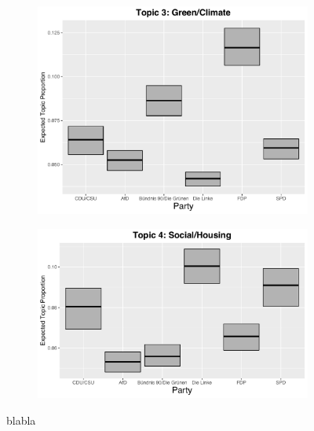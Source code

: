 \begin{figure}[h!]
  \centering
  \begin{subfigure}[b]{0.4\linewidth}
    \includegraphics[width=\linewidth]{../plots/appendix/5_1/beta_t3_cat.pdf}
  \end{subfigure}
  \begin{subfigure}[b]{0.4\linewidth}
    \includegraphics[width=\linewidth]{../plots/appendix/5_1/beta_t4_cat.pdf}
  \end{subfigure}
  \caption{blabla}
  \label{fig:coffee}
\end{figure}


